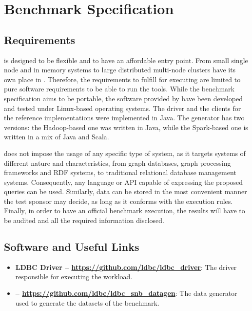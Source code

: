 \chapter{Benchmark Specification}
\label{sec:benchmark-specification}

\section{Requirements}

\ldbcsnb is designed to be flexible and to have an affordable entry point. From small single node and in memory systems to large distributed multi-node clusters have its own place in \ldbcsnb. Therefore, the requirements to fulfill for executing \ldbcsnb are limited to pure software requirements to be able to run the tools. While the benchmark specification aims to be portable, the software provided by \ldbcsnb have been developed and tested under Linux-based operating systems. The driver and the clients for the reference implementations were implemented in Java. The generator has two versions: the Hadoop-based one was written in Java, while the Spark-based one is written in a mix of Java and Scala.

\ldbcsnb does not impose the usage of any specific type of system, as it targets systems of different nature and characteristics, from graph databases, graph processing frameworks and RDF systems, to traditional relational database management systems. Consequently, any language or API capable of expressing the proposed queries can be used. Similarly, data can be stored in the most convenient manner the test sponsor may decide, as long as it conforms with the execution rules. Finally, in order to have an official benchmark execution, the results will have to be audited and all the required information disclosed.

\section{Software and Useful Links}

\begin{itemize}
    \item \textbf{LDBC Driver -- \url{https://github.com/ldbc/ldbc_driver}}: The driver
    responsible for executing the \ldbcsnb workload.
    \item \textbf{\datagen{} -- \url{https://github.com/ldbc/ldbc_snb_datagen}}: The data
    generator used to generate the datasets of the benchmark.
\end{itemize}
